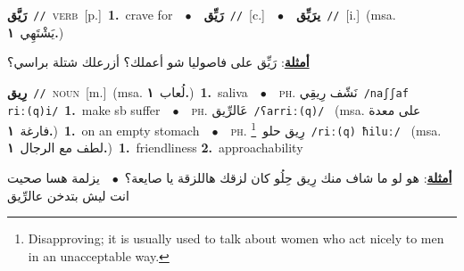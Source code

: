 \documentclass[10pt,a4paper,twoside]{article} %
\begin{document}
\begin{multicols}{2}
{\setlength\topsep{0pt}\textbf{\foreignlanguage{arabic}{رَيَّق}}\ {\color{gray}\texttt{//}\color{black}}\ \textsc{verb}\ [p.]\ \textbf{1.}~crave for\ \ $\bullet$\ \ \setlength\topsep{0pt}\textbf{\foreignlanguage{arabic}{رَيِّق}}\ {\color{gray}\texttt{//}\color{black}}\ [c.]\ \ $\bullet$\ \ \setlength\topsep{0pt}\textbf{\foreignlanguage{arabic}{يرَيِّق}}\ {\color{gray}\texttt{//}\color{black}}\ [i.]\ \color{gray}(msa. \foreignlanguage{arabic}{يَشْتَهِي}~\foreignlanguage{arabic}{\textbf{١.}})\color{black}\  \begin{flushright}\color{gray}\foreignlanguage{arabic}{\textbf{\underline{\foreignlanguage{arabic}{أمثلة}}}: رَيِّق على فاصوليا شو أعملك؟ أزرعلك شتلة براسي؟}\end{flushright}\color{black}} \vspace{2mm}

{\setlength\topsep{0pt}\textbf{\foreignlanguage{arabic}{رِيق}}\ {\color{gray}\texttt{//}\color{black}}\ \textsc{noun}\ [m.]\ \color{gray}(msa. \foreignlanguage{arabic}{لُعاب}~\foreignlanguage{arabic}{\textbf{١.}})\color{black}\ \textbf{1.}~saliva\ \ $\bullet$\ \ \textsc{ph.} \color{gray} \foreignlanguage{arabic}{نَشّف رِيقِي}\color{black}\ {\color{gray}\texttt{/{\sffamily naʃʃaf riː(q)i}/}\color{black}}\ \textbf{1.}~make sb suffer\ \ $\bullet$\ \ \textsc{ph.} \color{gray} \foreignlanguage{arabic}{عَالرِّيق}\color{black}\ {\color{gray}\texttt{/{\sffamily ʕarriː(q)}/}\color{black}}\ \color{gray} (msa. \foreignlanguage{arabic}{على معدة فارغة}~\foreignlanguage{arabic}{\textbf{١.}})\color{black}\ \textbf{1.}~on an empty stomach\ \ $\bullet$\ \ \textsc{ph.} \color{gray} \foreignlanguage{arabic}{رِيق حلو}\color{black}\ \footnote{Disapproving; it is usually used to talk about women who act nicely to men in an unacceptable way.}\ {\color{gray}\texttt{/{\sffamily riː(q) ħiluː}/}\color{black}}\ \color{gray} (msa. \foreignlanguage{arabic}{لطف مع الرجال}~\foreignlanguage{arabic}{\textbf{١.}})\color{black}\ \textbf{1.}~friendliness  \textbf{2.}~approachability\  \begin{flushright}\color{gray}\foreignlanguage{arabic}{\textbf{\underline{\foreignlanguage{arabic}{أمثلة}}}: هو لو ما شاف منك رِيق حِلُو كان لزقك هاللزقة يا صايعة؟\ $\bullet$\ \  يزلمة هسا صحيت انت ليش بتدخن عالرِّيق}\end{flushright}\color{black}} \vspace{2mm}


\end{multicols}
\end{document}
